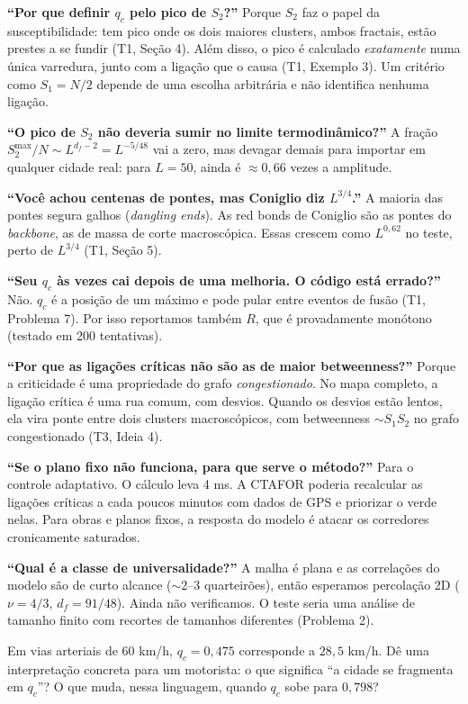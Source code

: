 \documentclass[11pt]{article}
\begin{document}
\textbf{``Por que definir $q_c$ pelo pico de $S_2$?''} Porque $S_2$ faz o papel da susceptibilidade: tem pico onde os dois maiores clusters, ambos fractais, estão prestes a se fundir (T1, Seção 4). Além disso, o pico é calculado \emph{exatamente} numa única varredura, junto com a ligação que o causa (T1, Exemplo 3). Um critério como $S_1 = N/2$ depende de uma escolha arbitrária e não identifica nenhuma ligação.

\textbf{``O pico de $S_2$ não deveria sumir no limite termodinâmico?''} A fração $S_2^{\max}/N\sim L^{d_f-2} = L^{-5/48}$ vai a zero, mas devagar demais para importar em qualquer cidade real: para $L=50$, ainda é $\approx0{,}66$ vezes a amplitude.

\textbf{``Você achou centenas de pontes, mas Coniglio diz $L^{3/4}$.''} A maioria das pontes segura galhos (\emph{dangling ends}). As red bonds de Coniglio são as pontes do \emph{backbone}, as de massa de corte macroscópica. Essas crescem como $L^{0{,}62}$ no teste, perto de $L^{3/4}$ (T1, Seção 5).

\textbf{``Seu $q_c$ às vezes cai depois de uma melhoria. O código está errado?''} Não. $q_c$ é a posição de um máximo e pode pular entre eventos de fusão (T1, Problema 7). Por isso reportamos também $R$, que é provadamente monótono (testado em 200 tentativas).

\textbf{``Por que as ligações críticas não são as de maior betweenness?''} Porque a criticidade é uma propriedade do grafo \emph{congestionado}. No mapa completo, a ligação crítica é uma rua comum, com desvios. Quando os desvios estão lentos, ela vira ponte entre dois clusters macroscópicos, com betweenness $\sim S_1S_2$ no grafo congestionado (T3, Ideia 4).

\textbf{``Se o plano fixo não funciona, para que serve o método?''} Para o controle adaptativo. O cálculo leva 4 ms. A CTAFOR poderia recalcular as ligações críticas a cada poucos minutos com dados de GPS e priorizar o verde nelas. Para obras e planos fixos, a resposta do modelo é atacar os corredores cronicamente saturados.

\textbf{``Qual é a classe de universalidade?''} A malha é plana e as correlações do modelo são de curto alcance ($\sim2$--3 quarteirões), então esperamos percolação 2D ($\nu=4/3$, $d_f=91/48$). Ainda não verificamos. O teste seria uma análise de tamanho finito com recortes de tamanhos diferentes (Problema 2).

 Em vias arteriais de 60 km/h, $q_c = 0{,}475$ corresponde a $28{,}5$ km/h. Dê uma interpretação concreta para um motorista: o que significa ``a cidade se fragmenta em $q_c$''? O que muda, nessa linguagem, quando $q_c$ sobe para $0{,}798$?
\end{document}
